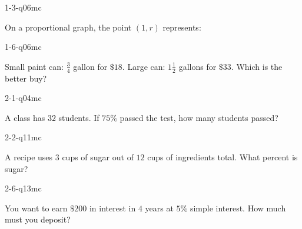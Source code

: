 
\begin{practiceQuestion}{1-3-q06}{mc}
\begin{questionText}
On a proportional graph, the point $(1, r)$ represents:
\end{questionText}
\end{practiceQuestion}

\begin{practiceQuestion}{1-6-q06}{mc}
\begin{questionText}
Small paint can: $\frac{3}{4}$ gallon for $\$18$. Large can: $1\frac{1}{2}$ gallons for $\$33$. Which is the better buy?
\end{questionText}
\end{practiceQuestion}

\begin{practiceQuestion}{2-1-q04}{mc}
\begin{questionText}
A class has $32$ students. If $75\%$ passed the test, how many students passed?
\end{questionText}
\end{practiceQuestion}

\begin{practiceQuestion}{2-2-q11}{mc}
\begin{questionText}
A recipe uses $3$ cups of sugar out of $12$ cups of ingredients total. What percent is sugar?
\end{questionText}
\end{practiceQuestion}

\begin{practiceQuestion}{2-6-q13}{mc}
\begin{questionText}
You want to earn $\$200$ in interest in $4$ years at $5\%$ simple interest. How much must you deposit?
\end{questionText}
\end{practiceQuestion}

